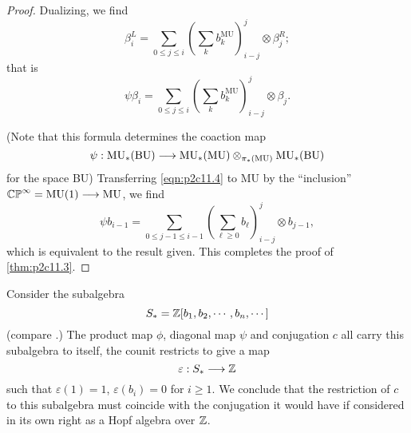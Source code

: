 \documentclass[../main]{subfiles}
\begin{document}
\begin{proof}
Dualizing, we find $$\beta_i^L = \sum_{0 \le j \le i} \left(\sum_k b_k^{\mathrm{MU}}\right)_{i - j}^j \otimes \beta_j^R;$$ that is 
\begin{equation}
\tag{11.4} 
\label{eqn:p2c11.4}
\psi \beta_i = \sum_{0 \le j \le i} \left(\sum_k b_k^{\mathrm{MU}}\right)_{i - j}^j \otimes \beta_j.
\end{equation}

(Note that this formula determines the coaction map $$\psi : \mathrm{MU}_\ast(\mathrm {BU}) \overset{}{\longrightarrow} \mathrm{MU}_\ast(\mathrm{MU}) \otimes_{\pi_\ast(\mathrm{MU})} \mathrm{MU}_\ast(\mathrm{BU})$$ for the space BU) Transferring \eqref{eqn:p2c11.4} to MU by the ``inclusion'' $\mathbb {CP}^\infty = \mathrm{MU}(1) \overset{}{\longrightarrow} \mathrm{MU}$, we find $$\psi b_{i - 1} = \sum_{0 \le j - 1 \le i - 1} \left(\sum_{\ell \ge 0} b_{\ell}\right)^j_{i - j} \otimes b_{j - 1},$$ which is equivalent to the result given. This completes the proof of \eqref{thm:p2c11.3}.
\end{proof}

\begin{notes}
Consider the subalgebra $$S_\ast = \mathbb{Z}[b_1, b_2, \cdots, b_n, \cdots]$$ (compare \cite[p.~20, Theorem 6.3]{adams2}.) The product map $\phi$, diagonal map $\psi$ and conjugation $c$ all carry this subalgebra to itself, the counit restricts to give a map $$\varepsilon : S_\ast \overset{}{\longrightarrow} \mathbb{Z}$$ such that $\varepsilon(1) = 1$, $\varepsilon(b_i) = 0$ for $i \ge 1$. We conclude that the restriction of $c$ to this subalgebra must coincide with the conjugation it would have if considered in its own right as a Hopf algebra over $\mathbb{Z}$. 
\end{notes}
\end{document}

